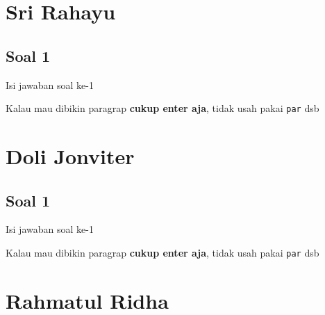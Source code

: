 

\section{Sri Rahayu}
\subsection{Soal 1}
Isi jawaban soal ke-1

Kalau mau dibikin paragrap \textbf{cukup enter aja}, tidak usah pakai \verb|par| dsb



\section{Doli Jonviter}
\subsection{Soal 1}
Isi jawaban soal ke-1

Kalau mau dibikin paragrap \textbf{cukup enter aja}, tidak usah pakai \verb|par| dsb



\section{Rahmatul Ridha}

